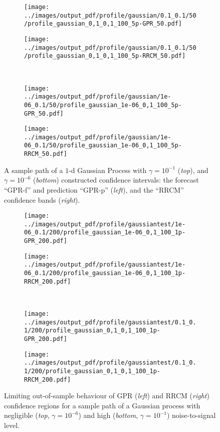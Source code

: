 \documentclass[conference]{IEEEtran}
\begin{document}
\begin{figure}%
  \centering
  \begin{subfigure}[b]{0.5\linewidth}
    \texttt{[image: ../images/output\_pdf/profile/gaussian/0.1\_0.1/50/profile\_gaussian\_0,1\_0,1\_100\_5p-GPR\_50.pdf]}
  \end{subfigure}%
  \begin{subfigure}[b]{0.5\linewidth}
    \texttt{[image: ../images/output\_pdf/profile/gaussian/0.1\_0.1/50/profile\_gaussian\_0,1\_0,1\_100\_5p-RRCM\_50.pdf]}
  \end{subfigure}\\
  \begin{subfigure}[b]{0.5\linewidth}
    \texttt{[image: ../images/output\_pdf/profile/gaussian/1e-06\_0.1/50/profile\_gaussian\_1e-06\_0,1\_100\_5p-GPR\_50.pdf]}
  \end{subfigure}%
  \begin{subfigure}[b]{0.5\linewidth}
    \texttt{[image: ../images/output\_pdf/profile/gaussian/1e-06\_0.1/50/profile\_gaussian\_1e-06\_0,1\_100\_5p-RRCM\_50.pdf]}
  \end{subfigure}%
  \caption{A sample path of a $1$-d Gaussian Process with $\gamma=10^{-1}$ (\textit{top}),
  and $\gamma=10^{-6}$ (\textit{bottom}) constructed confidence intervals: the forecast
  ``GPR-f'' and prediction ``GPR-p'' (\textit{left}), and the ``RRCM'' confidence
  bands (\textit{right}).}
  \label{fig:gauss_1d_prof_gpr_conf}
\end{figure}

\begin{figure}%
  \centering
  \begin{subfigure}[b]{0.5\linewidth}
    \texttt{[image: ../images/output\_pdf/profile/gaussiantest/1e-06\_0.1/200/profile\_gaussian\_1e-06\_0,1\_100\_1p-GPR\_200.pdf]}
  \end{subfigure}%
  \begin{subfigure}[b]{0.5\linewidth}
    \texttt{[image: ../images/output\_pdf/profile/gaussiantest/1e-06\_0.1/200/profile\_gaussian\_1e-06\_0,1\_100\_1p-RRCM\_200.pdf]}
  \end{subfigure}\\
  \begin{subfigure}[b]{0.5\linewidth}
    \texttt{[image: ../images/output\_pdf/profile/gaussiantest/0.1\_0.1/200/profile\_gaussian\_0,1\_0,1\_100\_1p-GPR\_200.pdf]}
  \end{subfigure}%
  \begin{subfigure}[b]{0.5\linewidth}
    \texttt{[image: ../images/output\_pdf/profile/gaussiantest/0.1\_0.1/200/profile\_gaussian\_0,1\_0,1\_100\_1p-RRCM\_200.pdf]}
  \end{subfigure}
  \caption{Limiting out-of-sample behaviour of GPR (\textit{left}) and RRCM (\textit{right})
    confidence regions for a sample path of a Gaussian process with negligible (\textit{top},
    $\gamma=10^{-6}$) and high (\textit{bottom}, $\gamma=10^{-1}$) noise-to-signal level.}
  \label{fig:limit_1d_ci_size}
\end{figure}
\end{document}
